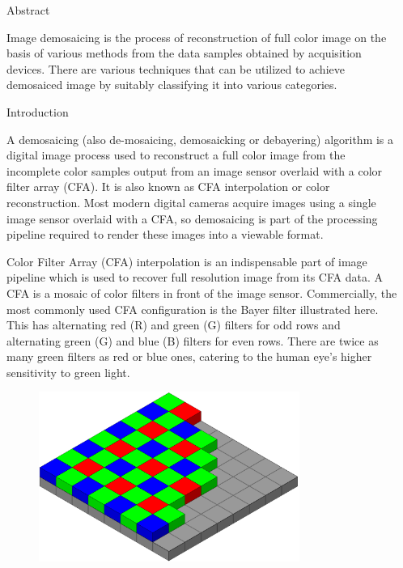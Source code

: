 \documentclass[final]{beamer}
\newlength{\sepwidth}
\newlength{\colwidth}
\newcommand{\separatorcolumn}{\begin{column}{\sepwidth}\end{column}}
\begin{document}
\begin{frame}[t]
\begin{columns}[t]
\separatorcolumn

\begin{column}{\colwidth}

  \begin{block}{Abstract}
  
 Image demosaicing is the process of reconstruction of full color image on the basis of various methods from the data samples obtained by acquisition devices. There are various techniques that can be utilized to achieve demosaiced image by suitably classifying it into various categories.
 \end{block}

  \begin{block}{Introduction}

A demosaicing (also de-mosaicing, demosaicking or debayering) algorithm is a digital image process used to reconstruct a full color image from the incomplete color samples output from an image sensor overlaid with a color filter array (CFA). It is also known as CFA interpolation or color reconstruction. Most modern digital cameras acquire images using a single image sensor overlaid with a CFA, so demosaicing is part of the processing pipeline required to render these images into a viewable format.

\lipsum

\lipsum


\par  Color Filter Array (CFA) interpolation is an indispensable part of image pipeline which is used to recover full resolution image from its CFA data. A CFA is a mosaic of color filters in front of the image sensor. Commercially, the most commonly used CFA configuration is the Bayer filter illustrated here. This has alternating red (R) and green (G) filters for odd rows and alternating green (G) and blue (B) filters for even rows. There are twice as many green filters as red or blue ones, catering to the human eye's higher sensitivity to green light.
\\
\lipsum
\begin{figure}
    \includegraphics[width=0.8\textwidth]{logos/1280px-Bayer_pattern_on_sensor.svg.png}
\end{figure}


\end{block}
\end{column}
\end{columns}
\end{frame}
\end{document}
